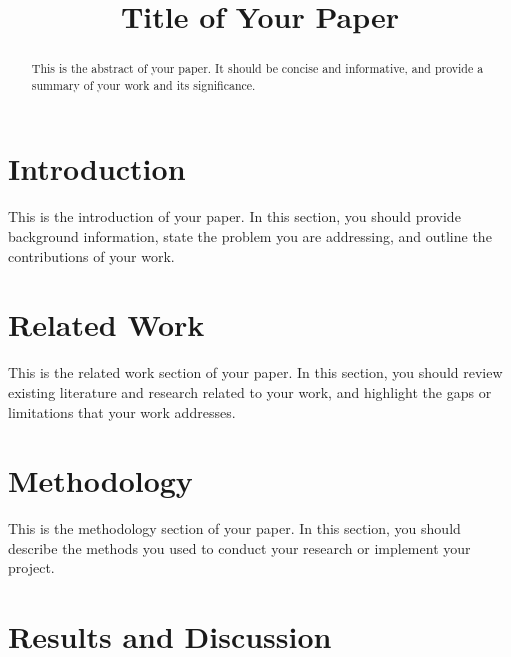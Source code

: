 \documentclass[conference]{IEEEtran}
\begin{document}
\title{Title of Your Paper}

\author{
\and
{}
}

\maketitle

\begin{abstract}
This is the abstract of your paper. It should be concise and informative, and provide a summary of your work and its significance.
\end{abstract}

\section{Introduction}
\label{sec:introduction}

This is the introduction of your paper. In this section, you should provide background information, state the problem you are addressing, and outline the contributions of your work.

\section{Related Work}
\label{sec:related-work}

This is the related work section of your paper. In this section, you should review existing literature and research related to your work, and highlight the gaps or limitations that your work addresses.

\section{Methodology}
\label{sec:methodology}

This is the methodology section of your paper. In this section, you should describe the methods you used to conduct your research or implement your project.

\section{Results and Discussion}
\label{sec:results-and-discussion}
\end{document}

